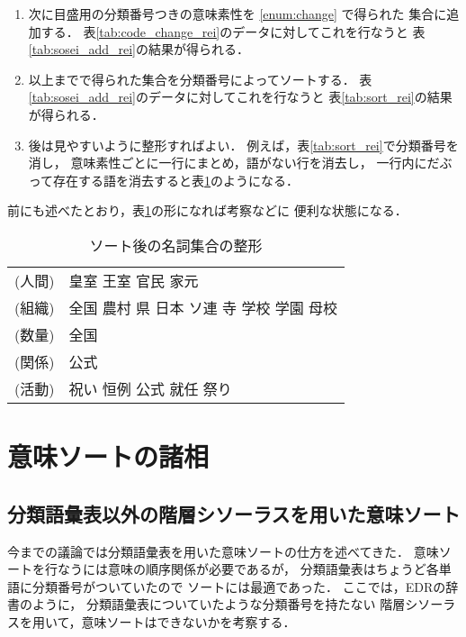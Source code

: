\begin{enumerate}
\item 
  次に目盛用の分類番号つきの意味素性を \ref{enum:change} で得られた
  集合に追加する．
  表\ref{tab:code_change_rei}のデータに対してこれを行なうと
  表\ref{tab:sosei_add_rei}の結果が得られる．

\item 
  以上までで得られた集合を分類番号によってソートする．
  表\ref{tab:sosei_add_rei}のデータに対してこれを行なうと
  表\ref{tab:sort_rei}の結果が得られる．

\item 
  後は見やすいように整形すればよい．
  例えば，表\ref{tab:sort_rei}で分類番号を消し，
  意味素性ごとに一行にまとめ，語がない行を消去し，
  一行内にだぶって存在する語を消去すると表\ref{tab:last_rei}のようになる．
\end{enumerate}

前にも述べたとおり，表\ref{tab:last_rei}の形になれば考察などに
便利な状態になる．


\clearpage

\begin{table}[t]
  \caption{ソート後の名詞集合の整形}
  \label{tab:last_rei}
  \begin{center}
\small\renewcommand{\arraystretch}{}
\begin{tabular}[c]{|ll|}\hline
(人間) & 皇室 王室 官民 家元 \\
(組織) & 全国 農村 県 日本 ソ連 寺 学校 学園 母校 \\
(数量) & 全国 \\
(関係) & 公式 \\
(活動) & 祝い 恒例 公式 就任 祭り \\\hline
\end{tabular}
\end{center}
\end{table}

\section{意味ソートの諸相}

\subsection{分類語彙表以外の階層シソーラスを用いた意味ソート}

今までの議論では分類語彙表を用いた意味ソートの仕方を述べてきた．
意味ソートを行なうには意味の順序関係が必要であるが，
分類語彙表はちょうど各単語に分類番号がついていたので
ソートには最適であった．
ここでは，EDRの辞書\cite{edr}のように，
分類語彙表についていたような分類番号を持たない
階層シソーラスを用いて，意味ソートはできないかを考察する．


